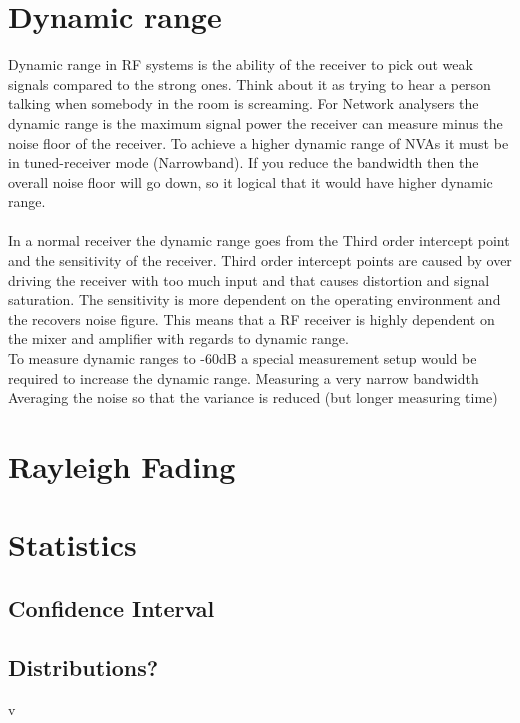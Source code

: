 \section{Dynamic range}
Dynamic range in RF systems is the ability of the receiver to pick out weak signals compared to the strong ones. Think about it as trying to hear a person talking when somebody in the room is screaming. For Network analysers the dynamic range is the maximum signal power the receiver can measure minus the noise floor of the receiver. To achieve a higher dynamic range of NVAs it must be  in tuned-receiver mode (Narrowband). If you reduce the bandwidth then the overall noise floor will go down, so it logical that it would have higher dynamic range. \\\citep{AgilentNVA} \\
In a normal receiver the dynamic range goes from the Third order intercept point and the sensitivity of the receiver. Third order intercept points are caused by over driving the receiver with too much input and that causes distortion and signal saturation. The sensitivity is more dependent on the operating environment and the recovers noise figure. \citep{understandDynamic} This means that a RF receiver is highly dependent on the mixer and amplifier with regards to dynamic range.\\
To measure dynamic ranges to -60dB a special measurement setup would be required to increase the dynamic range.
Measuring a very narrow bandwidth
Averaging the noise so that the variance is reduced (but longer measuring time)


\section{Rayleigh Fading}
\section{Statistics}
\subsection{Confidence Interval}
\subsection{Distributions?}v